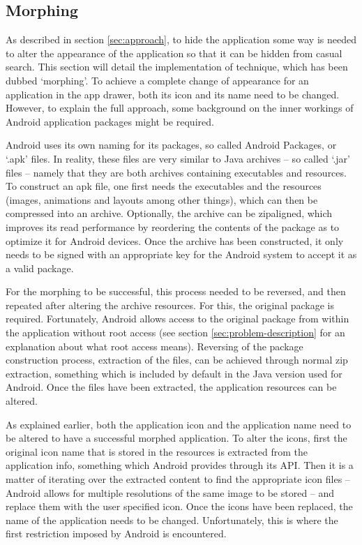 \subsection{Morphing}
\label{sec:implementation:morphing}

As described in section \ref{sec:approach}, to hide the application some way is needed to alter the appearance of the application so that it can be hidden from casual search.
This section will detail the implementation of technique, which has been dubbed `morphing'.
To achieve a complete change of appearance for an application in the app drawer, both its icon and its name need to be changed. 
However, to explain the full approach, some background on the inner workings of Android application packages might be required.

Android uses its own naming for its packages, so called Android Packages, or `.apk' files.
In reality, these files are very similar to Java archives -- so called `.jar' files -- namely that they are both archives containing executables and resources.
To construct an apk file, one first needs the executables and the resources (images, animations and layouts among other things), which can then be compressed into an archive.
Optionally, the archive can be zipaligned, which improves its read performance by reordering the contents of the package as to optimize it for Android devices.
Once the archive has been constructed, it only needs to be signed with an appropriate key for the Android system to accept it as a valid package.

For the morphing to be successful, this process needed to be reversed, and then repeated after altering the archive resources.
For this, the original package is required. 
Fortunately, Android allows access to the original package from within the application without root access (see section \ref{sec:problem-description} for an explanation about what root access means).
Reversing of the package construction process, extraction of the files, can be achieved through normal zip extraction, something which is included by default in the Java version used for Android.
Once the files have been extracted, the application resources can be altered.

As explained earlier, both the application icon and the application name need to be altered to have a successful morphed application.
To alter the icons, first the original icon name that is stored in the resources is extracted from the application info, something which Android provides through its API.
Then it is a matter of iterating over the extracted content to find the appropriate icon files -- Android allows for multiple resolutions of the same image to be stored -- and replace them with the user specified icon.
Once the icons have been replaced, the name of the application needs to be changed.
Unfortunately, this is where the first restriction imposed by Android is encountered.

